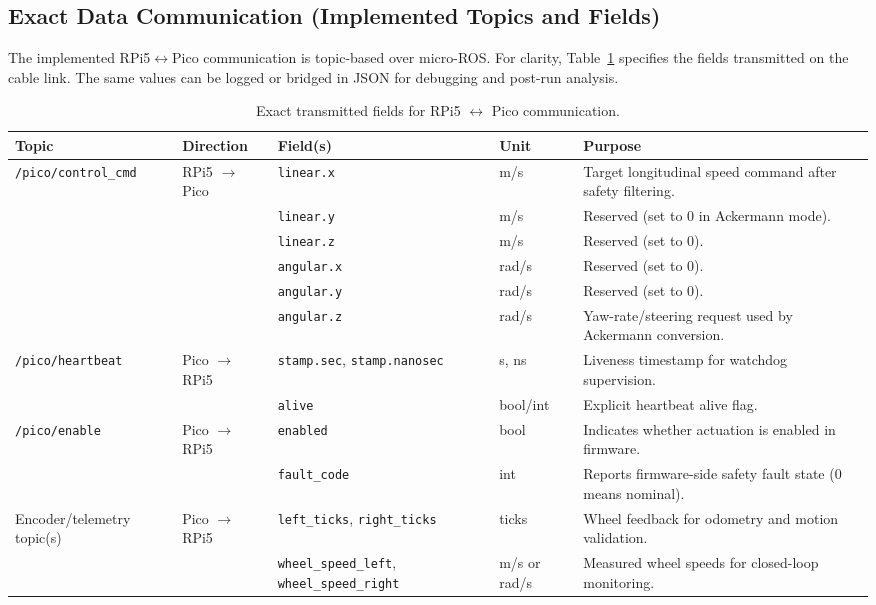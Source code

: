 \documentclass[12pt,a4paper]{report}
\begin{document}
\subsection{Exact Data Communication (Implemented Topics and Fields)}
The implemented RPi5$\leftrightarrow$Pico communication is topic-based over micro-ROS. For clarity, Table~\ref{tab:exact_fields_rpi5_pico} specifies the fields transmitted on the cable link. The same values can be logged or bridged in JSON for debugging and post-run analysis.

\begin{table}[H]
\centering
\caption{Exact transmitted fields for RPi5 $\leftrightarrow$ Pico communication.}
\label{tab:exact_fields_rpi5_pico}
\begin{tabularx}{\textwidth}{|p{2.7cm}|p{2.8cm}|p{3.2cm}|p{2.1cm}|X|}
\hline
\textbf{Topic} & \textbf{Direction} & \textbf{Field(s)} & \textbf{Unit} & \textbf{Purpose} \\
\hline
\texttt{/pico/control\_cmd} & RPi5 $\rightarrow$ Pico & \texttt{linear.x} & m/s & Target longitudinal speed command after safety filtering. \\
\cline{3-5}
 &  & \texttt{linear.y} & m/s & Reserved (set to 0 in Ackermann mode). \\
\cline{3-5}
 &  & \texttt{linear.z} & m/s & Reserved (set to 0). \\
\cline{3-5}
 &  & \texttt{angular.x} & rad/s & Reserved (set to 0). \\
\cline{3-5}
 &  & \texttt{angular.y} & rad/s & Reserved (set to 0). \\
\cline{3-5}
 &  & \texttt{angular.z} & rad/s & Yaw-rate/steering request used by Ackermann conversion. \\
\hline
\texttt{/pico/heartbeat} & Pico $\rightarrow$ RPi5 & \texttt{stamp.sec}, \texttt{stamp.nanosec} & s, ns & Liveness timestamp for watchdog supervision. \\
\cline{3-5}
 &  & \texttt{alive} & bool/int & Explicit heartbeat alive flag. \\
\hline
\texttt{/pico/enable} & Pico $\rightarrow$ RPi5 & \texttt{enabled} & bool & Indicates whether actuation is enabled in firmware. \\
\cline{3-5}
 &  & \texttt{fault\_code} & int & Reports firmware-side safety fault state (0 means nominal). \\
\hline
Encoder/telemetry topic(s) & Pico $\rightarrow$ RPi5 & \texttt{left\_ticks}, \texttt{right\_ticks} & ticks & Wheel feedback for odometry and motion validation. \\
\cline{3-5}
 &  & \texttt{wheel\_speed\_left}, \texttt{wheel\_speed\_right} & m/s or rad/s & Measured wheel speeds for closed-loop monitoring. \\
\hline
\end{tabularx}
\end{table}
\end{document}
